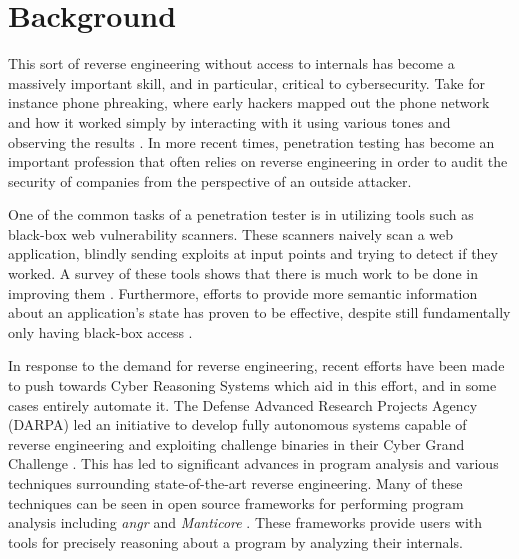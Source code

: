 \chapter{Background}

This sort of reverse engineering without access to internals has become a massively important skill, and in particular, critical to cybersecurity.
Take for instance phone phreaking, where early hackers mapped out the phone network and how it worked simply by interacting with it using various tones and observing the results \cite{mitnick2011art}.
In more recent times, penetration testing has become an important profession that often relies on reverse engineering in order to audit the security of companies from the perspective of an outside attacker.

One of the common tasks of a penetration tester is in utilizing tools such as black-box web vulnerability scanners.
These scanners naively scan a web application, blindly sending exploits at input points and trying to detect if they worked.
A survey of these tools shows that there is much work to be done in improving them \cite{doupe2010johnny}.
Furthermore, efforts to provide more semantic information about an application's state has proven to be effective, despite still fundamentally only having black-box access \cite{doupe2012enemy}.

In response to the demand for reverse engineering, recent efforts have been made to push towards Cyber Reasoning Systems which aid in this effort, and in some cases entirely automate it.
The Defense Advanced Research Projects Agency (DARPA) led an initiative to develop fully autonomous systems capable of reverse engineering and exploiting challenge binaries in their Cyber Grand Challenge \cite{shellphish2017cyber}.
This has led to significant advances in program analysis and various techniques surrounding state-of-the-art reverse engineering.
Many of these techniques can be seen in open source frameworks for performing program analysis including \textit{angr} and \textit{Manticore} \cite{shoshitaishvili2016state, stephens2016driller, shoshitaishvili2015firmalice}.
These frameworks provide users with tools for precisely reasoning about a program by analyzing their internals.
